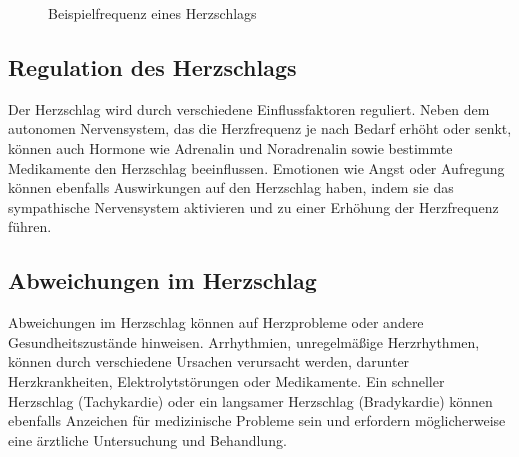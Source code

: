 {\begin{figure}[h]

       \caption{Beispielfrequenz eines Herzschlags}
        \label{fig:Beispielfrequenz}	
    \end{figure}
    
    \subsection{Regulation des Herzschlags}

    Der Herzschlag wird durch verschiedene Einflussfaktoren reguliert. Neben dem autonomen Nervensystem, das die Herzfrequenz je nach Bedarf erhöht oder senkt, können auch Hormone wie Adrenalin und Noradrenalin sowie bestimmte Medikamente den Herzschlag beeinflussen. Emotionen wie Angst oder Aufregung können ebenfalls Auswirkungen auf den Herzschlag haben, indem sie das sympathische Nervensystem aktivieren und zu einer Erhöhung der Herzfrequenz führen.\cite{Gesenberg:2017}
    
    \subsection{Abweichungen im Herzschlag}

    Abweichungen im Herzschlag können auf Herzprobleme oder andere Gesundheitszustände hinweisen. Arrhythmien, unregelmäßige Herzrhythmen, können durch verschiedene Ursachen verursacht werden, darunter Herzkrankheiten, Elektrolytstörungen oder Medikamente. Ein schneller Herzschlag (Tachykardie) oder ein langsamer Herzschlag (Bradykardie) können ebenfalls Anzeichen für medizinische Probleme sein und erfordern möglicherweise eine ärztliche Untersuchung und Behandlung.
    \cite{Gesenberg:2017}
    
    
}


